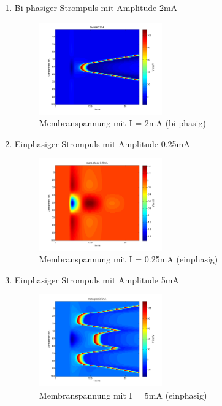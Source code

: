 \documentclass[conference]{IEEEtran}
\begin{document}
\begin{enumerate}
\item Bi-phasiger Strompuls mit Amplitude 2mA
\begin{figure}[h!]
	\centering
	\includegraphics[width=0.5\textwidth]{img/bi_2_1.png}
	\caption{Membranspannung mit I = 2mA (bi-phasig)}
	\label{fig:bi_2_1}
\end{figure}

\item Einphasiger Strompuls mit Amplitude 0.25mA
\begin{figure}[h!]
	\centering
	\includegraphics[width=0.5\textwidth]{img/mono_pos_025_1.png}
	\caption{Membranspannung mit I = 0.25mA (einphasig)}
	\label{fig:mono_pos_025_1}
\end{figure}

\item Einphasiger Strompuls mit Amplitude 5mA
\begin{figure}[h!]
	\centering
	\includegraphics[width=0.5\textwidth]{img/mono_pos_5_1.png}
	\caption{Membranspannung mit I = 5mA (einphasig)}
	\label{fig:mono_pos_5_1}
\end{figure}

\end{enumerate}
\end{document}
